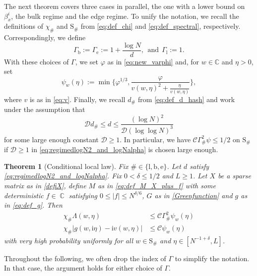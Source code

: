 \documentclass[10pt,a4paper]{amsart}
\DeclareMathOperator{\CC}{\mathbb{C}}
\newcommand{\ii}{\mathrm{i}}
\newcommand{\abs}[1]{\left| #1 \right|}
\newcommand{\absb}[1]{\bigl| #1 \bigr|}
\newcommand{\C}{\mathbb{C}}
\newtheorem{thm}[thhm]{Theorem}
\numberwithin{equation}{section}
\begin{document}
	 The next theorem covers three cases in parallel, the one with a lower bound on $\beta_x^i$, 
	the bulk regime and the edge regime. 
	To unify the notation, we recall the definitions of $\chi_\#$ and $\mathrm{S}_\#$ from \cref{eq:def_chi} and \cref{eq:def_spectral}, respectively.
 Correspondingly, we define 
	\[ 
	\Gamma_{\mathrm{b}} :=\Gamma_{\mathrm{e}} := 1 + \frac{\log N}{d},~~\text{and}~~ \Gamma_{\mathrm{l}} :=1.
	\] 
	With these choices of $\Gamma$, we set $\varphi$ as in \cref{eq:new_varphi} and, for $w \in \C$ and $\eta >0$, set 
	\begin{equation}\label{eq:def_up_bound} 
	\psi_w(\eta) := \min \biggl\{  {\varphi}^{1/3}, \frac{ {\varphi}}{v(w,\eta)^2 + \frac{\eta}{v(w,\eta)}}\biggr\}, 
	\end{equation}
	where $v$ is as in \cref{eq:v}. Finally, we recall $d_\#$ from \cref{eq:def_d_hash}  
	and work under the assumption that 
	\begin{equation}\label{eq:regimedlogN2_and_logNalpha}
	\mathcal D d_\# \le d \le \frac{(\log N)^{2}}{\mathcal D (\log \log N)^3} 
	\end{equation}
	for some large enough constant $\mathcal D\geq 1$. 
	In particular, we have $\mathcal C \Gamma_\#^2\psi\leq 1/2$ on $\mathrm{S}_\#$ if 
	$\mathcal D \geq 1$ in \cref{eq:regimedlogN2_and_logNalpha} is chosen large enough. 
	

	
	\begin{thm}[Conditional local law]\label{thm:locallaw_edge}
	 Fix $\# \in \{ \mathrm{l}, \mathrm{b}, \mathrm{e}\}$. Let $d$ satisfy \eqref{eq:regimedlogN2_and_logNalpha}. 
		Fix $ 0 < \delta \le 1/2$ and $L \ge 1$. Let $X$ be a sparse matrix as in \cref{defiX}, define $M$ as in \eqref{eq:def_M_X_plus_f} with some deterministic $f\in \CC$ satisfying $0 \le \abs{f} \le N^{\delta/6}$, $G$ as in \eqref{Greenfunction} and $g$ as in \eqref{eq:def_g}. 
		Then  
		\begin{align} 
			\chi_\# \Lambda(w, \eta) & \leq \mathcal C\Gamma_\#^2 \psi_w(\eta) \label{eq:local_law_Lambda} \\ 
			\chi_\#  \absb{g(w,\ii \eta) - \ii v(w,\eta)} & \leq \mathcal C \psi_w(\eta)	\label{eq:loclawStieljes2} 
		\end{align}
		with very high probability uniformly for all $w \in \mathrm{S}_\#$ and $\eta \in [N^{-1 + \delta}, L]$.
	\end{thm}
	Throughout the following, we often drop the index of $\Gamma$ to simplify the notation. In that case, the argument holds for either choice of $\Gamma$.
	
\end{document}
